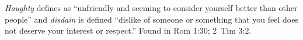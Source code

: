 \emph{Haughty} defines as ``unfriendly and seeming to consider yourself better than other people'' and \emph{disdain} is defined ``dislike of someone or something that you feel does not deserve your interest or respect.''
Found in Rom 1:30; 2~Tim 3:2.
